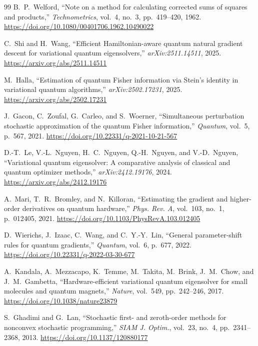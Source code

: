 \documentclass[sn-mathphys,Numbered]{sn-jnl}
\theoremstyle{thmstyleone}
\theoremstyle{thmstyletwo}
\theoremstyle{thmstylethree}
\begin{document}
\begin{thebibliography}{99}
B.~P.~Welford,
\newblock ``Note on a method for calculating corrected sums of squares and products,''
\newblock \emph{Technometrics}, vol.~4, no.~3, pp.~419--420, 1962. \url{https://doi.org/10.1080/00401706.1962.10490022}

C.~Shi and H.~Wang,
\newblock ``Efficient Hamiltonian-aware quantum natural gradient descent for variational quantum eigensolvers,''
\newblock \emph{arXiv:2511.14511}, 2025. \url{https://arxiv.org/abs/2511.14511}

M.~Halla,
\newblock ``Estimation of quantum Fisher information via Stein's identity in variational quantum algorithms,''
\newblock \emph{arXiv:2502.17231}, 2025. \url{https://arxiv.org/abs/2502.17231}

J.~Gacon, C.~Zoufal, G.~Carleo, and S.~Woerner,
\newblock ``Simultaneous perturbation stochastic approximation of the quantum Fisher information,''
\newblock \emph{Quantum}, vol.~5, p.~567, 2021. \url{https://doi.org/10.22331/q-2021-10-21-567}

D.-T.~Le, V.-L.~Nguyen, H.~C.~Nguyen, Q.-H.~Nguyen, and V.-D.~Nguyen,
\newblock ``Variational quantum eigensolver: A comparative analysis of classical and quantum optimizer methods,''
\newblock \emph{arXiv:2412.19176}, 2024. \url{https://arxiv.org/abs/2412.19176}

A.~Mari, T.~R.~Bromley, and N.~Killoran,
\newblock ``Estimating the gradient and higher-order derivatives on quantum hardware,''
\newblock \emph{Phys. Rev. A}, vol.~103, no.~1, p.~012405, 2021. \url{https://doi.org/10.1103/PhysRevA.103.012405}

D.~Wierichs, J.~Izaac, C.~Wang, and C.~Y.-Y.~Lin,
\newblock ``General parameter-shift rules for quantum gradients,''
\newblock \emph{Quantum}, vol.~6, p.~677, 2022. \url{https://doi.org/10.22331/q-2022-03-30-677}

A.~Kandala, A.~Mezzacapo, K.~Temme, M.~Takita, M.~Brink, J.~M.~Chow, and J.~M.~Gambetta,
\newblock ``Hardware-efficient variational quantum eigensolver for small molecules and quantum magnets,''
\newblock \emph{Nature}, vol.~549, pp.~242--246, 2017. \url{https://doi.org/10.1038/nature23879}

S.~Ghadimi and G.~Lan,
\newblock ``Stochastic first- and zeroth-order methods for nonconvex stochastic programming,''
\newblock \emph{SIAM J. Optim.}, vol.~23, no.~4, pp.~2341--2368, 2013. \url{https://doi.org/10.1137/120880177}


\end{thebibliography}
\end{document}
